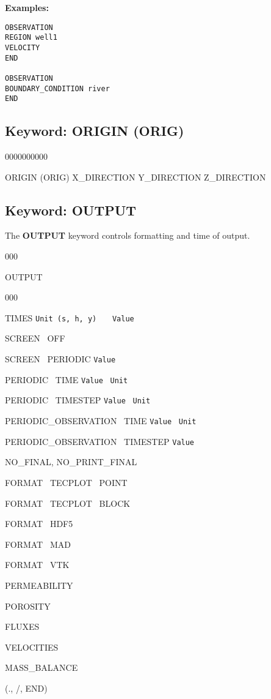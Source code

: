 \documentclass[12pt]{article}
\begin{document}
{\noindent\bf Examples:}
\begin{verbatim}
OBSERVATION
REGION well1
VELOCITY
END

OBSERVATION
BOUNDARY_CONDITION river
END
\end{verbatim}


\newpage
\protect\hypertarget{target_orig}{}

\subsection{Keyword: ORIGIN (ORIG)}
\begin{deflist}{0000000000}
\item[ORIGIN (ORIG)] X\_DIRECTION Y\_DIRECTION Z\_DIRECTION
\end{deflist}



\newpage
\protect\hypertarget{target_output}{}

\subsection{Keyword: OUTPUT}

 The {\bf OUTPUT} keyword controls formatting and time of output.


\begin{deflist}{000}
\item[OUTPUT] ~
\begin{deflist}{000}
\item[TIMES] {\tt Unit (s, h, y)} \ \ \ {\tt Value} 
\item[SCREEN \ OFF]
\item[SCREEN \ PERIODIC] {\tt Value}
\item[PERIODIC \ TIME] {\tt Value} \ {\tt Unit}
\item[PERIODIC \ TIMESTEP] {\tt Value} \ {\tt Unit}
\item[PERIODIC\_OBSERVATION \ TIME] {\tt Value} \ {\tt Unit}
\item[PERIODIC\_OBSERVATION \ TIMESTEP] {\tt Value}
\item[NO\_FINAL, NO\_PRINT\_FINAL]
\item[FORMAT \ TECPLOT \ POINT]
\item[FORMAT \ TECPLOT \ BLOCK]
\item[FORMAT \ HDF5]
\item[FORMAT \ MAD]
\item[FORMAT \ VTK]
\item[PERMEABILITY]
\item[POROSITY]
\item[FLUXES]
\item[VELOCITIES]
\item[MASS\_BALANCE]
\end{deflist}
\item[(., /, END)]
\end{deflist}
\end{document}
